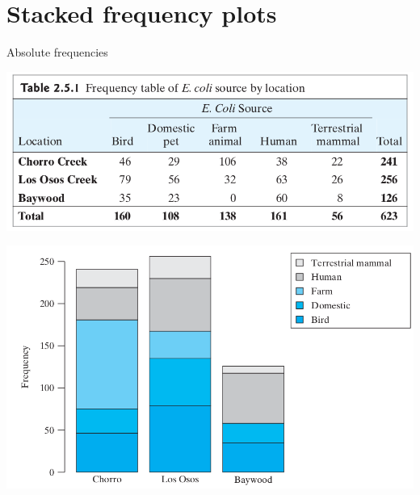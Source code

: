 \section{Stacked frequency plots}

\begin{frame}{Absolute frequencies}
    \begin{center}
            \includegraphics[width=.8\textwidth]{ecoli-counts-tab2_5_1.png}

            \includegraphics[width=.8\textwidth]{ecoli-counts-fig2_5_1.png}
    \end{center}
\end{frame}

